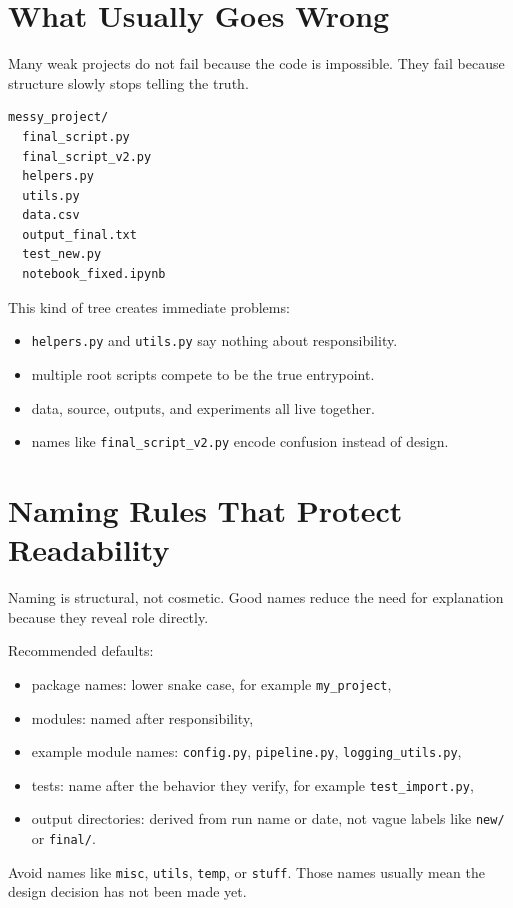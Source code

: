 \documentclass[11pt,oneside]{book}
\begin{document}
\section*{What Usually Goes Wrong}

Many weak projects do not fail because the code is impossible.  
They fail because structure slowly stops telling the truth.

\begin{lstlisting}[style=bookcode]
messy_project/
  final_script.py
  final_script_v2.py
  helpers.py
  utils.py
  data.csv
  output_final.txt
  test_new.py
  notebook_fixed.ipynb
\end{lstlisting}

This kind of tree creates immediate problems:
\begin{itemize}
  \item \texttt{helpers.py} and \texttt{utils.py} say nothing about responsibility.
  \item multiple root scripts compete to be the true entrypoint.
  \item data, source, outputs, and experiments all live together.
  \item names like \texttt{final\_script\_v2.py} encode confusion instead of design.
\end{itemize}

\section*{Naming Rules That Protect Readability}

Naming is structural, not cosmetic.  
Good names reduce the need for explanation because they reveal role directly.

Recommended defaults:
\begin{itemize}
  \item package names: lower snake case, for example \texttt{my\_project},
  \item modules: named after responsibility,
  \item example module names: \texttt{config.py}, \texttt{pipeline.py}, \texttt{logging\_utils.py},
  \item tests: name after the behavior they verify, for example \texttt{test\_import.py},
  \item output directories: derived from run name or date, not vague labels like \texttt{new/} or \texttt{final/}.
\end{itemize}

Avoid names like \texttt{misc}, \texttt{utils}, \texttt{temp}, or \texttt{stuff}.  
Those names usually mean the design decision has not been made yet.
\end{document}
